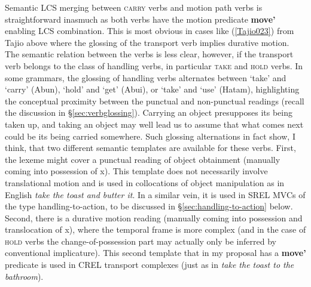 Semantic LCS merging between \textsc{carry} verbs and motion path verbs is straightforward inasmuch as both verbs have the motion predicate \textbf{move'} enabling LCS combination. This is most obvious in cases like (\ref{Tajio023}) from Tajio above where the glossing of the transport verb implies durative motion. The semantic relation between the verbs is less clear, however, if the transport verb belongs to the class of handling verbs, in particular \textsc{take} and \textsc{hold} verbs. In some grammars, the glossing of handling verbs alternates between `take' and `carry' (Abun), `hold' and `get' (Abui), or `take' and `use' (Hatam), highlighting the conceptual proximity between the punctual and non-punctual readings (recall the discussion in §\ref{sec:verbglossing}). Carrying an object presupposes its being taken up, and taking an object may well lead us to assume that what comes next could be its being carried somewhere. Such glossing alternations in fact show, I think, that two different semantic templates are available for these verbs. First, the lexeme might cover a punctual reading of object obtainment (manually coming into possession of x). This template does not necessarily involve translational motion and is used in collocations of object manipulation as in English \textit{take the toast and butter it}. In a similar vein, it is used in SREL MVCs of the type handling-to-action, to be discussed in §\ref{sec:handling-to-action} below. Second, there is a durative motion reading (manually coming into possession and translocation of x), where the temporal frame is more complex (and in the case of \textsc{hold} verbs the change-of-possession part may actually only be inferred by conventional implicature). This second template that in my proposal has a \textbf{move'} predicate is used in CREL transport complexes (just as in \textit{take the toast to the bathroom}). 

